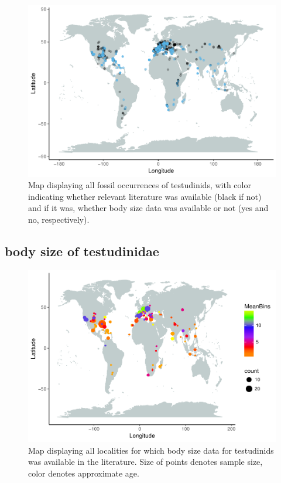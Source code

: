 \documentclass[]{article}
\begin{document}
\begin{figure}[htbp]
\centering
\includegraphics{MA_JJ_files/figure-latex/MapFossilOccurrences-1.pdf}
\caption{Map displaying all fossil occurrences of testudinids, with
color indicating whether relevant literature was available (black if
not) and if it was, whether body size data was available or not (yes and
no, respectively).}
\end{figure}

\newpage

\subsection{body size of testudinidae}\label{body-size-of-testudinidae}

\begin{figure}[htbp]
\centering
\includegraphics{MA_JJ_files/figure-latex/MapCL-1.pdf}
\caption{Map displaying all localities for which body size data for
testudinids was available in the literature. Size of points denotes
sample size, color denotes approximate age.}
\end{figure}
\end{document}
